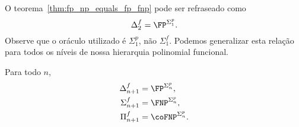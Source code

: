 O teorema~\ref{thm:fp_np_equals_fp_fnp}
pode ser refraseado como
\begin{equation*}
    \Delta_2^f = \FP^{\Sigma_1^p}.
\end{equation*}
Observe que o oráculo utilizado é $\Sigma_1^p$, não $\Sigma_1^f$.
Podemos generalizar esta relação
para todos os níveis de nossa hierarquia polinomial funcional.

\begin{theorem}
    Para todo $n$,
    \begin{align*}
        \Delta_{n+1}^f &= \FP^{\Sigma_n^p}, \\
        \Sigma_{n+1}^f &= \FNP^{\Sigma_n^p}, \\
        \Pi_{n+1}^f &= \coFNP^{\Sigma_n^p}. \\
    \end{align*}
\end{theorem}

